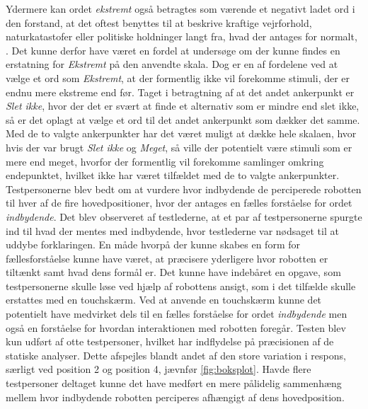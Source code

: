 Ydermere kan ordet \textit{ekstremt} også betragtes som værende et negativt ladet ord i den forstand, at det oftest benyttes til at beskrive kraftige vejrforhold, naturkatastofer eller politiske holdninger langt fra, hvad der antages for normalt, \parencite{WEB:Oxford}. Det kunne derfor have været en fordel at undersøge om der kunne findes en erstatning for \textit{Ekstremt} på den anvendte skala. Dog er en af fordelene ved at vælge et ord som \textit{Ekstremt}, at der formentlig ikke vil forekomme stimuli, der er endnu mere ekstreme end før. Taget i betragtning af at det andet ankerpunkt er \textit{Slet ikke}, hvor der det er svært at finde et alternativ som er mindre end slet ikke, så er det oplagt at vælge et ord til det andet ankerpunkt som dækker det samme. Med de to valgte ankerpunkter har det været muligt at dække hele skalaen, hvor hvis der var brugt \textit{Slet ikke} og \textit{Meget}, så ville der potentielt være stimuli som er mere end meget, hvorfor der formentlig vil forekomme samlinger omkring endepunktet, hvilket ikke har været tilfældet med de to valgte ankerpunkter.\blankline
%
Testpersonerne blev bedt om at vurdere hvor indbydende de perciperede robotten til hver af de fire hovedpositioner, hvor der antages en fælles forståelse for ordet \textit{indbydende}. Det blev observeret af testlederne, at et par af testpersonerne spurgte ind til hvad der mentes med indbydende, hvor testlederne var nødsaget til at uddybe forklaringen. En måde hvorpå der kunne skabes en form for fællesforståelse kunne have været, at præcisere yderligere hvor robotten er tiltænkt samt hvad dens formål er. Det kunne have indebåret en opgave, som testpersonerne skulle løse ved hjælp af robottens ansigt, som i det tilfælde skulle erstattes med en touchskærm. Ved at anvende en touchskærm kunne det potentielt have medvirket dels til en fælles forståelse for ordet \textit{indbydende} men også en forståelse for hvordan interaktionen med robotten foregår. \blankline
%
Testen blev kun udført af otte testpersoner, hvilket har indflydelse på præcisionen af de statiske analyser. Dette afspejles blandt andet af den store variation i respons, særligt ved position 2 og position 4, jævnfør \autoref{fig:boksplot}. Havde flere testpersoner deltaget kunne det have medført en mere pålidelig sammenhæng mellem hvor indbydende robotten perciperes afhængigt af dens hovedposition. 



